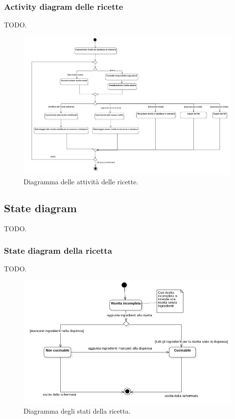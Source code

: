 \documentclass{article}
\begin{document}
\subsubsection{Activity diagram delle ricette}

TODO.

\begin{figure}[H]
    \includegraphics[width=\linewidth]{images/activity-recipe.png}
    \caption{Diagramma delle attività delle ricette.}
    \label{fig:actrecipe}
\end{figure}

\subsection{State diagram}

TODO.

\subsubsection{State diagram della ricetta}

TODO.

\begin{figure}[H]
    \includegraphics[width=\linewidth]{images/state-recipe.png}
    \caption{Diagramma degli stati della ricetta.}
    \label{fig:staterecipe}
\end{figure}
\end{document}
